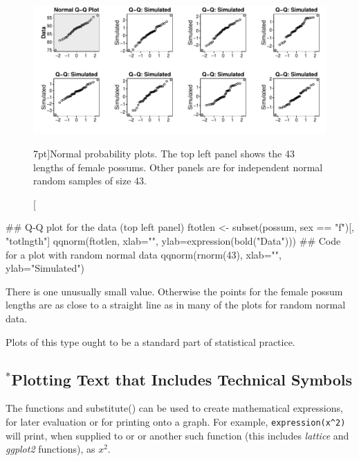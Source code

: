 \begin{figure}
\begin{Schunk}


\centerline{\includegraphics[width=\textwidth]{figs/07-possum-qqn-1} }

\end{Schunk}
 \caption[][7pt]{Normal probability plots. The top left panel
   shows the 43 lengths
of female possums. Other panels are for independent normal
random samples of size 43.\label{fig:np-plots}}
\vspace*{-24pt}

\end{figure}

\begin{Schunk}
\begin{Sinput}
## Q-Q plot for the data (top left panel)
ftotlen <- subset(possum, sex == "f")[, "totlngth"]
qqnorm(ftotlen, xlab="",
       ylab=expression(bold("Data")))
## Code for a plot with random normal data
qqnorm(rnorm(43), xlab="", ylab="Simulated")
\end{Sinput}
\end{Schunk}

\noindent There is one unusually small value.  Otherwise the points
for the female possum lengths are as close to a straight line as in
many of the plots for random normal data.

Plots of this type ought to be a standard part of statistical
practice.  

\subsection{$^*$Plotting Text that Includes Technical  Symbols}\label{sec:mathvec}

The functions  and {substitute()} can be used
to create mathematical expressions, for later evaluation or for
printing onto a graph.  For example, \verb+expression(x^2)+ will
print, when supplied to  or  or another
such function (this includes {\em lattice} and {\em ggplot2} functions),
as $x^2$.

